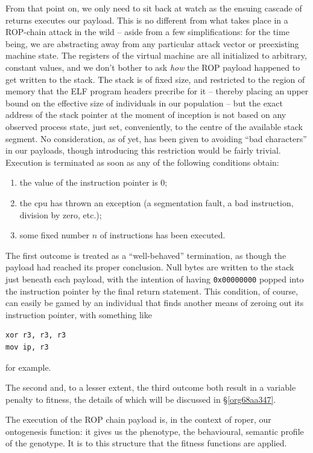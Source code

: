 \documentclass[12pt,glossary]{dalthesis}
\begin{document}
From that point on, we only need to sit back at watch as the ensuing cascade of
returns executes our payload. This is no different from what takes place in
a ROP-chain attack in the wild -- aside from a few simplifications: for the time
being, we are abstracting away from any particular attack vector or preexisting
machine state. The registers of the virtual machine are all initialized to arbitrary,
constant values, and we don't bother to ask \emph{how} the ROP payload happened to get
written to the stack. The stack is of fixed size, and restricted to the region
of memory that the ELF program headers precribe for it -- thereby placing an upper
bound on the effective size of individuals in our population -- but the exact
address of the stack pointer at the moment of inception is not based on any
observed process state, just set, conveniently, to the centre of the available
stack segment. No consideration, as of yet, has been given to avoiding ``bad
characters'' in our payloads, though introducing this restriction would be fairly
trivial. Execution is terminated as soon as any of the following conditions obtain:
\begin{enumerate}
\item the value of the instruction pointer is 0;
\item the \gls{cpu} has thrown an exception (a segmentation fault, a bad instruction,
division by zero, etc.);
\item some fixed number \(n\) of instructions has been executed.
\end{enumerate}

The first outcome is treated as a ``well-behaved'' termination, as though the
payload had reached its proper conclusion. Null bytes are written to the
stack just beneath each payload, with the intention of having \texttt{0x00000000}
popped into the instruction pointer by the final return statement. This condition, 
of course, can easily be gamed by an individual that finds another means of
zeroing out its instruction pointer, with something like
\begin{verbatim}
xor r3, r3, r3
mov ip, r3
\end{verbatim}
for example. 

The second and, to a lesser extent, the third outcome both result in a variable
penalty to fitness, the details of which will be discussed in \S \ref{org68aa347}.

The execution of the ROP chain payload is, in the context of \gls{roper}, our
ontogenesis function: it gives us the phenotype, the behavioural, semantic
profile of the genotype. It is to this structure that the fitness functions
are applied. 
\end{document}
